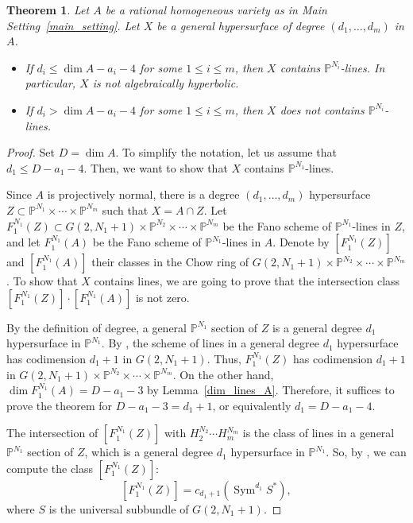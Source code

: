 \documentclass[11pt]{amsart}
\numberwithin{equation}{section}
\newtheorem{theorem}{Theorem}[section]
\theoremstyle{definition}
\theoremstyle{remark}
\renewcommand{\P}{\mathbb{P}}
\DeclareMathOperator{\Sym}{Sym}
\begin{document}
\begin{theorem}\label{linestheorem}
    Let $A$ be a rational homogeneous variety as in Main Setting~\ref{main_setting}. Let $X$ be a general hypersurface of degree $(d_1, \hdots , d_m)$ in $A$.
    \begin{itemize}
        \item If $d_i\le \dim A - a_i - 4$ for some $1\le i\le m$, then $X$ contains $\P^{N_i}$-lines. In particular, $X$ is not algebraically hyperbolic.
        \item If $d_i > \dim A - a_i - 4$ for some $1\le i\le m$, then $X$ does not contains $\P^{N_i}$-lines.
    \end{itemize}
\end{theorem}
\begin{proof}
    Set $D = \dim A$. To simplify the notation, let us assume that $d_1\le D-a_1-4$. Then, we want to show that $X$ contains $\P^{N_1}$-lines.

    Since $A$ is projectively normal, there is a degree $(d_1,\hdots,d_m)$ hypersurface $Z\subset \P^{N_1}\times \cdots \times \P^{N_m}$ such that $X = A\cap Z$. Let $F_1^{N_1}(Z)\subset G(2,N_1+1)\times \P^{N_2}\times \cdots \times \P^{N_m}$ be the Fano scheme of $\P^{N_1}$-lines in $Z$, and let $F_1^{N_1}(A)$ be the Fano scheme of $\P^{N_1}$-lines in $A$. Denote by $[F_1^{N_1}(Z)]$ and $[F_1^{N_1}(A)]$ their classes in the Chow ring of $G(2,N_1+1)\times \P^{N_2}\times \cdots \times \P^{N_m}$. To show that $X$ contains lines, we are going to prove that the intersection class $[F_1^{N_1}(Z)]\cdot [F_1^{N_1}(A)]$ is not zero.

    By the definition of degree, a general $\P^{N_1}$ section of $Z$ is a general degree $d_1$ hypersurface in $\P^{N_1}$. By \cite[Theorem 6.34]{3264}, the scheme of lines in a general degree $d_1$ hypersurface has codimension $d_1+1$ in $G(2,N_1+1)$. Thus, $F_1^{N_1}(Z)$ has codimension $d_1+1$ in $G(2,N_1+1)\times \P^{N_2}\times \cdots \times \P^{N_m}$. On the other hand, $\dim F_1^{N_1}(A) = D - a_1 - 3$ by Lemma~\ref{dim_lines_A}. Therefore, it suffices to prove the theorem for $D-a_1-3=d_1+1$, or equivalently $d_1=D-a_1-4$.
        
    The intersection of $[F_1^{N_1}(Z)]$ with $H_2^{N_2}\cdots H_m^{N_m}$ is the class of lines in a general $\P^{N_1}$ section of $Z$, which is a general degree $d_1$ hypersurface in $\P^{N_1}$. So, by \cite[Proposition 6.4]{3264}, we can compute the class $[F_1^{N_1}(Z)]$:
    \[ \left[F_1^{N_1}(Z)\right] = c_{d_1+1}(\Sym^{d_1} S^*), \]
    where $S$ is the universal subbundle of $G(2, N_1+1)$.


\end{proof}
\end{document}
